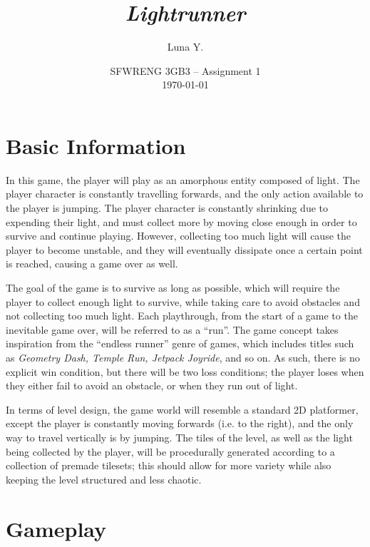 \documentclass[10pt]{article}
\begin{document}
\title{\textit{Lightrunner}}
\author{Luna Y.}
\date{
    SFWRENG 3GB3 -- Assignment 1\\[0.25cm]
    \today
}
\maketitle

\tableofcontents

\section{Basic Information}

In this game, the player will play as an amorphous entity composed of light. The player character is constantly travelling forwards,
and the only action available to the player is jumping. The player character is constantly shrinking due to expending their light,
and must collect more by moving close enough in order to survive and continue playing. However, collecting too much light will
cause the player to become unstable, and they will eventually dissipate once a certain point is reached, causing a game over as well.

The goal of the game is to survive as long as possible, which will require the player to collect enough light to survive,
while taking care to avoid obstacles and not collecting too much light. Each playthrough, from the start of a game to the inevitable game over,
will be referred to as a ``run''. The game concept takes inspiration from the ``endless runner'' genre of games,
which includes titles such as \textit{Geometry Dash, Temple Run, Jetpack Joyride}, and so on. As such, there is no explicit win condition,
but there will be two loss conditions; the player loses when they either fail to avoid an obstacle, or when they run out of light.

In terms of level design, the game world will resemble a standard 2D platformer, except the player is constantly moving forwards (i.e. to the right),
and the only way to travel vertically is by jumping. The tiles of the level, as well as the light being collected by the player,
will be procedurally generated according to a collection of premade tilesets; this should allow for more variety while also keeping
the level structured and less chaotic.

\pagebreak

\section{Gameplay}
\end{document}
